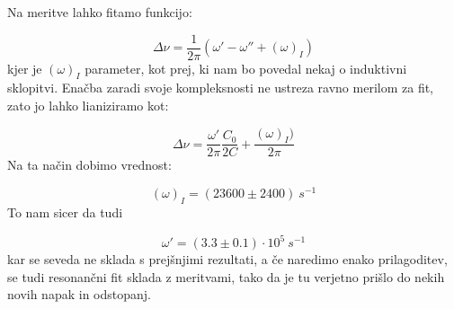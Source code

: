 \documentclass[12pt]{article}
\begin{document}
Na meritve lahko fitamo funkcijo:

$$
\Delta \nu = \frac{1}{2\pi}(\omega' - \omega '' + (\omega)_I)
$$
kjer je $(\omega)_I$ parameter, kot prej, ki nam bo povedal nekaj o induktivni sklopitvi. Enačba zaradi svoje kompleksnosti ne ustreza ravno merilom za fit, zato jo lahko lianiziramo kot:

$$
\Delta \nu = \frac{\omega '}{2\pi}\frac{C_0}{2 C} + \frac{(\omega)_I)}{2\pi}
$$
Na ta način dobimo vrednost:

$$
(\omega)_I = (23600 \pm 2400)\ s^{-1}
$$
To nam sicer da tudi

$$
\omega' = (3.3\pm 0.1)\cdot 10^{5}\ s^{-1}
$$
kar se seveda ne sklada s prejšnjimi rezultati, a če naredimo enako prilagoditev, se tudi resonančni fit sklada z meritvami, tako da je tu verjetno prišlo do nekih novih napak in odstopanj.
\end{document}
